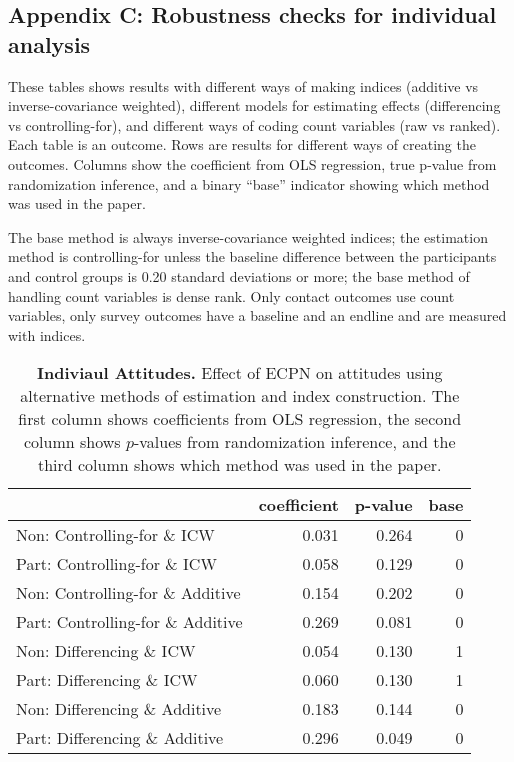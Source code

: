 \documentclass[
]{article}
\begin{document}
\hypertarget{appendix-c-robustness-checks-for-individual-analysis}{%
\subsection{Appendix C: Robustness checks for individual
analysis}\label{appendix-c-robustness-checks-for-individual-analysis}}

These tables shows results with different ways of making indices
(additive vs inverse-covariance weighted), different models for
estimating effects (differencing vs controlling-for), and different ways
of coding count variables (raw vs ranked). Each table is an outcome.
Rows are results for different ways of creating the outcomes. Columns
show the coefficient from OLS regression, true p-value from
randomization inference, and a binary ``base'' indicator showing which
method was used in the paper.

The base method is always inverse-covariance weighted indices; the
estimation method is controlling-for unless the baseline difference
between the participants and control groups is 0.20 standard deviations
or more; the base method of handling count variables is dense rank. Only
contact outcomes use count variables, only survey outcomes have a
baseline and an endline and are measured with indices.

\begin{table}[H]
\begin{center}
\label{tab:attitude_tab_ind}
\caption{\textbf{Indiviaul Attitudes.} Effect of ECPN on attitudes using alternative methods of estimation and index construction. The first column shows coefficients from OLS regression, the second column shows $p$-values from randomization inference, and the third column shows which method was used in the paper.}
\smallskip

\begin{tabular}{l|r|r|r}
\hline
  & coefficient & p-value & base\\
\hline
Non: Controlling-for \& ICW & 0.031 & 0.264 & 0\\
\hline
Part: Controlling-for \& ICW & 0.058 & 0.129 & 0\\
\hline
Non: Controlling-for \& Additive & 0.154 & 0.202 & 0\\
\hline
Part: Controlling-for \& Additive & 0.269 & 0.081 & 0\\
\hline
Non: Differencing \& ICW & 0.054 & 0.130 & 1\\
\hline
Part: Differencing \& ICW & 0.060 & 0.130 & 1\\
\hline
Non: Differencing \& Additive & 0.183 & 0.144 & 0\\
\hline
Part: Differencing \& Additive & 0.296 & 0.049 & 0\\
\hline
\end{tabular}


\end{center}
\end{table}
\end{document}
